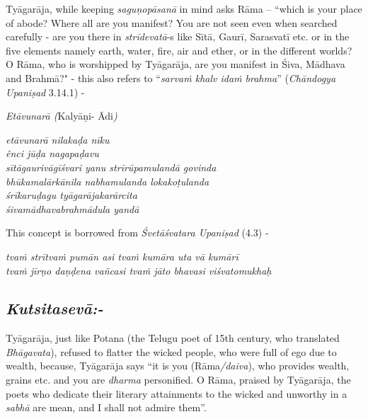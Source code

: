 Tyāgarāja, while keeping \textit{saguṇopāsanā} in mind asks Rāma – ``which is your place of abode? Where all are you manifest? You are not seen even when searched carefully - are you there in \textit{strīdevatā}-s like Sītā\textit{,} Gaurī\textit{,} Sarasvatī etc. or in the five elements namely earth, water, fire, air and ether, or in the different worlds? O Rāma, who is worshipped by Tyāgarāja, are you manifest in Śiva, Mādhava and Brahmā?" - this also refers to “\textit{sarvaṁ khalv idaṁ brahma}” (\textit{Chāndogya Upaniṣad} 3.14.1) - 

\textit{Etāvunarā (}Kalyāṇi- Ādi\textit{)}

\begin{centerquote}
\textit{etāvunarā nilakaḍa nīku}\\ \textit{ênci jūḍa nagapaḍavu}\\ \textit{sītāgaurivāgīśvari yanu strīrūpamulandā govinda}\\ \textit{bhūkamalārkānila nabhamulanda lokakoṭulanda}\\ \textit{śrīkaruḍagu tyāgarājakarārcita}\\ \textit{śivamādhavabrahmādula yandā}
\end{centerquote}

This concept is borrowed from \textit{Śvetāśvatara Upaniṣad} (4.3) -

\begin{myquote}
\textit{tvaṁ strītvaṁ pumān asi tvaṁ kumāra uta vā kumārī }\\ \textit{tvaṁ jīrṇo daṇḍena vañcasi tvaṁ jāto bhavasi viśvatomukhaḥ} 
\end{myquote}

\vspace{-.2cm}

\subsection*{\textit{Kutsitasevā:-}}

\vspace{-.2cm}

Tyāgarāja, just like Potana (the Telugu poet of 15th century, who translated \textit{Bhāgavata}), refused to flatter the wicked people, who were full of ego due to wealth, because, Tyāgarāja says “it is you (Rāma\textit{/daiva}), who provides wealth, grains etc. and you are \textit{dharma} personified. O Rāma, praised by Tyāgarāja, the poets who dedicate their literary attainments to the wicked and unworthy in a \textit{sabhā} are mean, and I shall not admire them”. 

